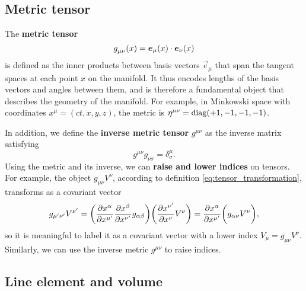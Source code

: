 \subsection{Metric tensor}

The \textbf{metric tensor}
\begin{equation}
	g\indices{_\mu_\nu}(x) = \vec{e}_\mu(x) \cdot \vec{e}_\nu(x)
\label{eq:def_metric}
\end{equation}
is defined as the inner products between basis vectors $\vec{e}_\mu$ that span the tangent spaces at each point $x$ on the manifold.
It thus encodes lengths of the basis vectors and angles between them, and is therefore a fundamental object that describes the geometry of the manifold.
For example, in Minkowski space with coordinates $x^\mu = (ct, x, y, z)$, the metric is $\eta\indices{^\mu^\nu} = \diag (+1, -1, -1, -1)$.

In addition, we define the \textbf{inverse metric tensor} $g^{\mu \nu}$ as the inverse matrix satisfying
\begin{equation}
	g^{\mu \nu} g_{\nu \sigma} = \delta^\mu_\sigma .
\end{equation}
Using the metric and its inverse, we can \textbf{raise and lower indices} on tensors.
For example, the object $g_{\mu \nu} V^\nu$, according to definition \eqref{eq:tensor_transformation}, transforms as a covariant vector
\begin{equation}
	g_{\mu' \nu'} V^{\nu'} = \bigg( \pdv{x^{\alpha}}{x^{\mu'}} \pdv{x^{\beta}}{x^{\nu'}} g_{\alpha \beta} \bigg) \bigg( \pdv{x^{\nu'}}{x^{\nu}} V^{\nu} \bigg) = \pdv{x^{\alpha}}{x^{\mu'}} \bigg( g_{\alpha \nu} V^\nu \bigg) ,
\end{equation}
so it is meaningful to label it as a covariant vector with a lower index $V_\mu = g_{\mu \nu} V^\nu$.
Similarly, we can use the inverse metric $g^{\mu \nu}$ to raise indices.

\subsection{Line element and volume}

